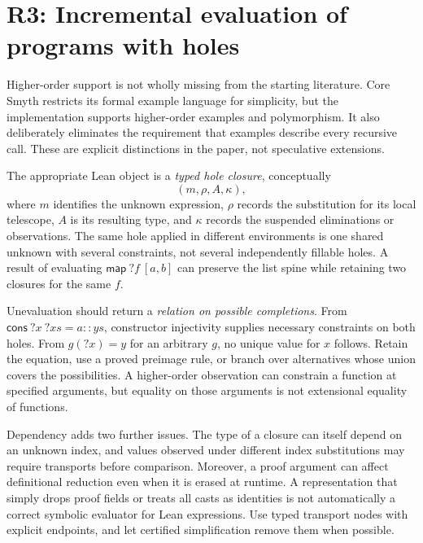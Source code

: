 \section{R3: Incremental evaluation of programs with holes}\label{sec:evaluation}


\answer Higher-order support is not wholly missing from the starting literature. Core Smyth restricts its formal example language for simplicity, but the implementation supports higher-order examples and polymorphism. It also deliberately eliminates the requirement that examples describe every recursive call. These are explicit distinctions in the paper, not speculative extensions.\cite{smyth}

The appropriate Lean object is a \emph{typed hole closure}, conceptually
\[
 (m,\rho,A,\kappa),
\]
where $m$ identifies the unknown expression, $\rho$ records the substitution for its local telescope, $A$ is its resulting type, and $\kappa$ records the suspended eliminations or observations. The same hole applied in different environments is one shared unknown with several constraints, not several independently fillable holes. A result of evaluating $\mathsf{map}\ ?f\ [a,b]$ can preserve the list spine while retaining two closures for the same $f$.

Unevaluation should return a \emph{relation on possible completions}. From $\mathsf{cons}\ ?x\ ?xs = a::ys$, constructor injectivity supplies necessary constraints on both holes. From $g(?x)=y$ for an arbitrary $g$, no unique value for $x$ follows. Retain the equation, use a proved preimage rule, or branch over alternatives whose union covers the possibilities. A higher-order observation can constrain a function at specified arguments, but equality on those arguments is not extensional equality of functions.

Dependency adds two further issues. The type of a closure can itself depend on an unknown index, and values observed under different index substitutions may require transports before comparison. Moreover, a proof argument can affect definitional reduction even when it is erased at runtime. A representation that simply drops proof fields or treats all casts as identities is not automatically a correct symbolic evaluator for Lean expressions. Use typed transport nodes with explicit endpoints, and let certified simplification remove them when possible.

